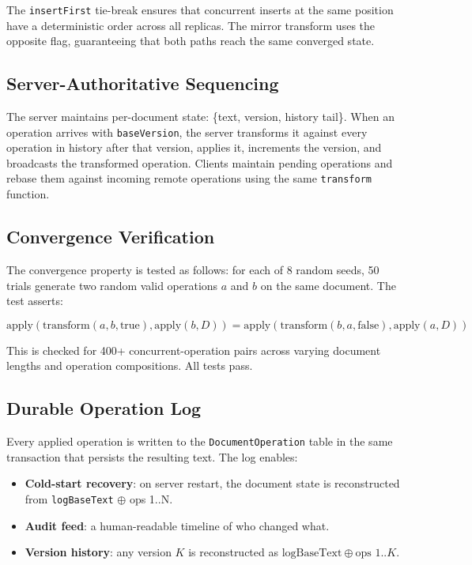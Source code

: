 \documentclass[conference]{IEEEtran}
\begin{document}
The \texttt{insertFirst} tie-break ensures that concurrent inserts at the same position have a deterministic order across all replicas. The mirror transform uses the opposite flag, guaranteeing that both paths reach the same converged state.

\subsection{Server-Authoritative Sequencing}

The server maintains per-document state: \{text, version, history tail\}. When an operation arrives with \texttt{baseVersion}, the server transforms it against every operation in history after that version, applies it, increments the version, and broadcasts the transformed operation. Clients maintain pending operations and rebase them against incoming remote operations using the same \texttt{transform} function.

\subsection{Convergence Verification}

The convergence property is tested as follows: for each of 8 random seeds, 50 trials generate two random valid operations $a$ and $b$ on the same document. The test asserts:

\begin{equation}
\text{apply}(\text{transform}(a,b,\text{true}), \text{apply}(b, D)) = \text{apply}(\text{transform}(b,a,\text{false}), \text{apply}(a, D))
\end{equation}

This is checked for 400+ concurrent-operation pairs across varying document lengths and operation compositions. All tests pass.

\subsection{Durable Operation Log}

Every applied operation is written to the \texttt{DocumentOperation} table in the same transaction that persists the resulting text. The log enables:
\begin{itemize}
\item \textbf{Cold-start recovery}: on server restart, the document state is reconstructed from \texttt{logBaseText} $\oplus$ ops 1..N.
\item \textbf{Audit feed}: a human-readable timeline of who changed what.
\item \textbf{Version history}: any version $K$ is reconstructed as $\text{logBaseText} \oplus \text{ops } 1..K$.
\end{itemize}
\end{document}
